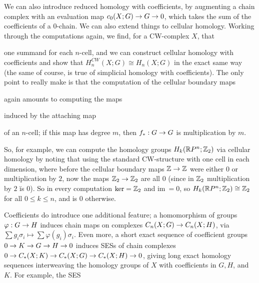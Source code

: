 \ssk

We can also introduce
reduced homology with coefficients, by augmenting a chain complex with an evaluation map 
$c_0(X;G)\rightarrow G\rightarrow 0$, which takes the sum of the coefficients of a $0$-chain. 
We can also extend things to cellular homology. Working through
the computations again, we find, for a CW-complex $X$, that 

\ssk


\ssk

one summand for each $n$-cell, and we can construct cellular 
homology with coefficients and show that $H_n^{CW}(X;G)\cong H_n(X;G)$ in the exact same way 
(the same of course, is true of simplicial homology with coefficients). The only point to really
make is that the computation of the cellular boundary maps 

\ssk


\ssk

again amounts to computing
the maps 

\ssk


\ssk

induced by the attaching map 

\ssk


\ssk

of an $n$-cell; 
if this map has degree $m$, then $f_*:G\rightarrow G$ is multiplication by $m$. 

\vfill
\eject

So, for
example, we can compute the homology groups 
$H_k({\Bbb R} P^n;{\Bbb Z}_2)$ via cellular homology by noting that using the standard CW-structure
with one cell in each dimension, where before the cellular boundary maps ${\Bbb Z}\rightarrow{\Bbb Z}$ were either
$0$ or multiplication by $2$, now the maps ${\Bbb Z}_2\rightarrow {\Bbb Z}_2$ are all $0$ (since in ${\Bbb Z}_2$ 
multiplication by $2$ \u{is} $0$). So in every computation $\ker = {\Bbb Z}_2$ and $\text{im}\ = 0$,
so $H_k({\Bbb R} P^n;{\Bbb Z}_2)\cong {\Bbb Z}_2$ for all $0\leq k\leq n$, and is $0$ otherwise.

\msk

Coefficients do introduce one additional feature; a homomorphism of groups
$\varphi:G\rightarrow H$ induces chain maps on complexes $C_n(X;G)\rightarrow C_n(X;H)$, via
$\sum g_i\sigma_i\mapsto \sum \varphi(g_i)\sigma_i$. Even more, a short exact
sequence of coefficient groups $0\rightarrow K\rightarrow G\rightarrow H\rightarrow 0$ induces SESs of chain
complexes $0\rightarrow C_*(X;K)\rightarrow C_*(X;G)\rightarrow C_*(X;H)\rightarrow 0$, giving long exact homology
sequences interweaving the homology groups of $X$ with coefficients in $G,H$, and $K$.
For example, the SES 

